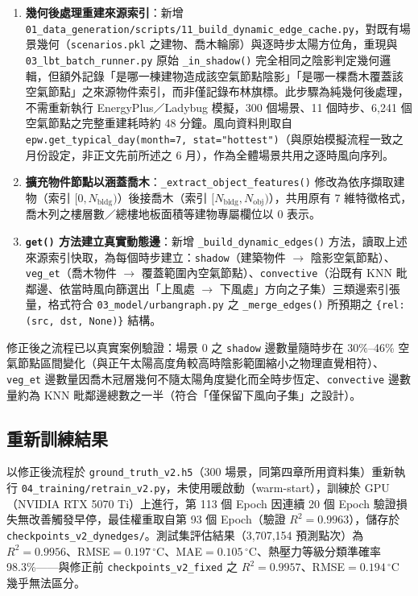 \begin{enumerate}
    \item \textbf{幾何後處理重建來源索引}：新增 \texttt{01\_data\_generation/scripts/11\_build\_dynamic\_edge\_cache.py}，對既有場景幾何（\texttt{scenarios.pkl} 之建物、喬木輪廓）與逐時步太陽方位角，重現與 \texttt{03\_lbt\_batch\_runner.py} 原始 \texttt{\_in\_shadow()} 完全相同之陰影判定幾何邏輯，但額外記錄「是哪一棟建物造成該空氣節點陰影」「是哪一棵喬木覆蓋該空氣節點」之來源物件索引，而非僅記錄布林旗標。此步驟為純幾何後處理，不需重新執行 EnergyPlus／Ladybug 模擬，300 個場景、11 個時步、6,241 個空氣節點之完整重建耗時約 48 分鐘。風向資料則取自 \texttt{epw.get\_typical\_day(month=7, stat="hottest")}（與原始模擬流程一致之月份設定，非正文先前所述之 6 月），作為全體場景共用之逐時風向序列。
    \item \textbf{擴充物件節點以涵蓋喬木}：\texttt{\_extract\_object\_features()} 修改為依序擷取建物（索引 $[0, N_{\text{bldg}})$）後接喬木（索引 $[N_{\text{bldg}}, N_{\text{obj}})$），共用原有 7 維特徵格式，喬木列之樓層數／總樓地板面積等建物專屬欄位以 0 表示。
    \item \textbf{\texttt{get()} 方法建立真實動態邊}：新增 \texttt{\_build\_dynamic\_edges()} 方法，讀取上述來源索引快取，為每個時步建立：\texttt{shadow}（建築物件 $\to$ 陰影空氣節點）、\texttt{veg\_et}（喬木物件 $\to$ 覆蓋範圍內空氣節點）、\texttt{convective}（沿既有 KNN 毗鄰邊、依當時風向篩選出「上風處 $\to$ 下風處」方向之子集）三類邊索引張量，格式符合 \texttt{03\_model/urbangraph.py} 之 \texttt{\_merge\_edges()} 所預期之 \texttt{\{rel: (src, dst, None)\}} 結構。
\end{enumerate}

修正後之流程已以真實案例驗證：場景 0 之 \texttt{shadow} 邊數量隨時步在 30\%--46\% 空氣節點區間變化（與正午太陽高度角較高時陰影範圍縮小之物理直覺相符）、\texttt{veg\_et} 邊數量因喬木冠層幾何不隨太陽角度變化而全時步恆定、\texttt{convective} 邊數量約為 KNN 毗鄰邊總數之一半（符合「僅保留下風向子集」之設計）。

\subsection{重新訓練結果}

以修正後流程於 \texttt{ground\_truth\_v2.h5}（300 場景，同第四章所用資料集）重新執行 \texttt{04\_training/retrain\_v2.py}，未使用暖啟動（warm-start），訓練於 GPU（NVIDIA RTX 5070 Ti）上進行，第 113 個 Epoch 因連續 20 個 Epoch 驗證損失無改善觸發早停，最佳權重取自第 93 個 Epoch（驗證 $R^2=0.9963$），儲存於 \texttt{checkpoints\_v2\_dynedges/}。測試集評估結果（3,707,154 預測點次）為 $R^2=0.9956$、RMSE$=0.197\,^\circ\text{C}$、MAE$=0.105\,^\circ\text{C}$、熱壓力等級分類準確率 98.3\%——與修正前 \texttt{checkpoints\_v2\_fixed} 之 $R^2=0.9957$、RMSE$=0.194\,^\circ\text{C}$ 幾乎無法區分。

